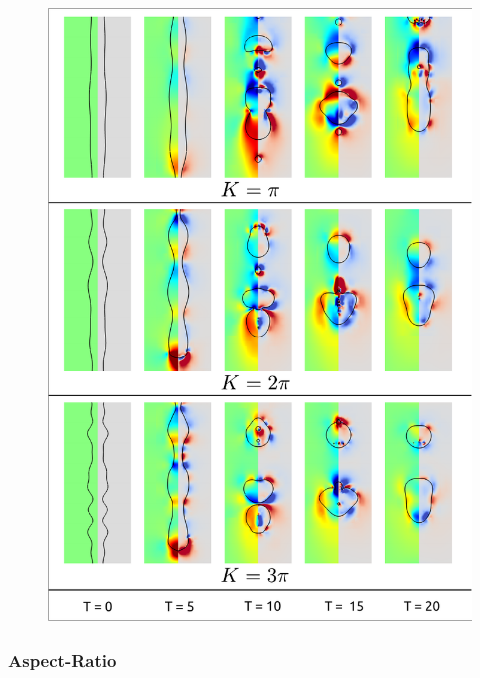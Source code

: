 \begin{figure}
\centering
\includegraphics{plots/ligament_breakup/wave_compare.pdf}
	\caption{\blindtext}
\label{wave_comp}
\end{figure}

\subsubsection*{Aspect-Ratio}

